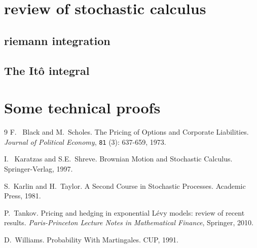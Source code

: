 \documentclass[a4paper]{article}
\theoremstyle{definition}
\numberwithin{equation}{section}
\begin{document}
\appendix

\section{review of stochastic calculus}
\subsection{riemann integration}
\subsection{The It\^o integral}


\section{Some technical proofs}



\newpage


\begin{thebibliography}{9}
F.~ Black and M.~Scholes.
The Pricing of Options and Corporate Liabilities.
\textit{Journal of Political Economy}, {\tt 81} (3): 637-659, 1973.

I.~ Karatzas and S.E.~Shreve.
Brownian Motion and Stochastic Calculus.
Springer-Verlag, 1997.

S.~Karlin and H.~Taylor.
A Second Course in Stochastic Processes. 
Academic Press, 1981.

 P.~Tankov.
Pricing and hedging in exponential L\'evy models: review of recent results. 
\textit{Paris-Princeton Lecture Notes in Mathematical Finance}, Springer, 2010. 

D.~Williams.
Probability With Martingales.
CUP, 1991.

\end{thebibliography}
\end{document}
